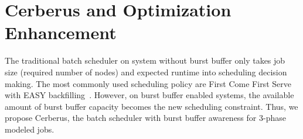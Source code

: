 \section{Cerberus and Optimization Enhancement}
\label{Sec:Scheduler}

The traditional batch scheduler on system without burst buffer only
takes job size (required number of nodes) and expected runtime into scheduling decision making. 
The most commonly used scheduling policy are First Come First Serve with EASY backfilling~\cite{tsafrir-tpds-2007}.
However, on burst buffer enabled systems, 
the available amount of burst buffer capacity becomes the new scheduling constraint. 
Thus, we propose Cerberus, 
the batch scheduler with burst buffer awareness for 3-phase modeled jobs. 


